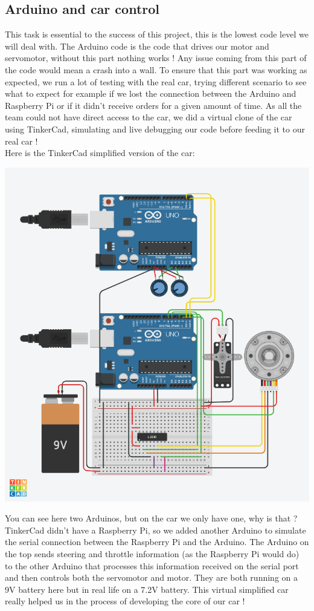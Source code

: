 \documentclass[12pt]{article}
\begin{document}
\subsection{Arduino and car control}
This task is essential to the success of this project, this is the lowest code level we will deal with. The Arduino code is the code that drives our motor and servomotor, without this part nothing works ! Any issue coming from this part of the code would mean a crash into a wall. To ensure that this part was working as expected, we run a lot of testing with the real car, trying different scenario to see what to expect for example if we lost the connection between the Arduino and Raspberry Pi or if it didn't receive orders for a given amount of time. As all the team could not have direct access to the car, we did a virtual clone of the car using TinkerCad, simulating and live debugging our code before feeding it to our real car !\\
Here is the TinkerCad simplified version of the car:

\centerline{\includegraphics[width=16cm]{../../docs/car-hardware.png}}

You can see here two Arduinos, but on the car we only have one, why is that ? TinkerCad didn't have a Raspberry Pi, so we added another Arduino to simulate the serial connection between the Raspberry Pi and the Arduino. The Arduino on the top sends steering and throttle information (as the Raspberry Pi would do) to the other Arduino that processes this information received on the serial port and then controls both the servomotor and motor. They are both running on a 9V battery here but in real life on a 7.2V battery.
This virtual simplified car really helped us in the process of developing the core of our car !
\end{document}
